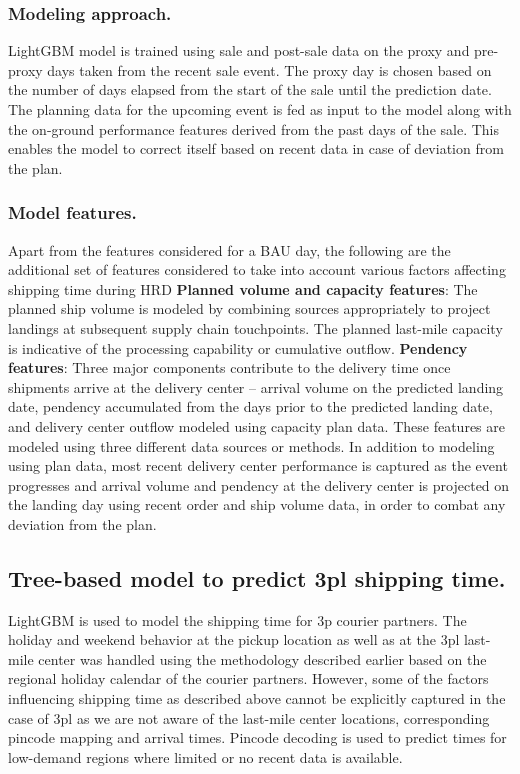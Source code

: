 \documentclass[twoside,leqno,twocolumn]{article}
\begin{document}
\subsubsection{Modeling approach.}
LightGBM model is trained using sale and post-sale data on the proxy and pre-proxy days taken from the recent sale event. The proxy day is chosen based on the number of days elapsed from the start of the sale until the prediction date. The planning data for the upcoming event is fed as input to the model along with the on-ground performance features derived from the past days of the sale. This enables the model to correct itself based on recent data in case of deviation from the plan.
\subsubsection{Model features.} 
Apart from the features considered for a BAU day, the following are the additional set of features considered to take into account various factors affecting shipping time during HRD
\vspace{0.1cm}\newline \textbf{Planned volume and capacity features}: The planned ship volume is modeled by combining sources appropriately to project landings at subsequent supply chain touchpoints. The planned last-mile capacity is indicative of the processing capability or cumulative outflow.
\newline \textbf{Pendency features}: Three major components contribute to the delivery time once shipments arrive at the delivery center – arrival volume on the predicted landing date, pendency accumulated from the days prior to the predicted landing date, and delivery center outflow modeled using capacity plan data. These features are modeled using three different data sources or methods. In addition to modeling using plan data, most recent delivery center performance is captured as the event progresses and arrival volume and pendency at the delivery center is projected on the landing day using recent order and ship volume data, in order to combat any deviation from the plan.

\subsection{Tree-based model to predict 3pl shipping time.}
LightGBM is used to model the shipping time for 3p courier partners. The holiday and weekend behavior at the pickup location as well as at the 3pl last-mile center was handled using the methodology described earlier based on the regional holiday calendar of the courier partners. However, some of the factors influencing shipping time as described above cannot be explicitly captured in the case of 3pl as we are not aware of the last-mile center locations, corresponding pincode mapping and arrival times. Pincode decoding is used to predict times for low-demand regions where limited or no recent data is available.
\end{document}
